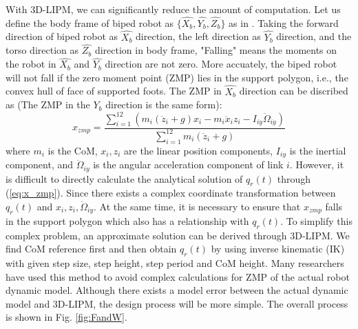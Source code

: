 \documentclass{ieeeaccess}
\begin{document}
With 3D-LIPM, we can significantly reduce the amount of computation. Let us define the body frame of biped robot as $\{ \widehat{X_b}, \widehat{Y_b}, \widehat{Z_b} \}$ as in \cite{ourrobot}. Taking the forward direction of biped robot as $\widehat{X_b}$ direction, the left direction as $\widehat{Y_b}$ direction, and the torso direction as $\widehat{Z_b}$ direction in body frame, "Falling" means the moments on the robot in $\widehat{X_b}$ and $\widehat{Y_b}$ direction are not zero. More accuately, the biped robot will not fall if the zero moment point (ZMP) lies in the support polygon, i.e., the convex hull of face of supported foots. The ZMP in $\widehat{X_b}$ direction can be discribed as \cite{huang2001planning} (The ZMP in the $\widehat{Y_b}$ direction is the same form):
\begin{equation} \label{eq:x_zmp}
    x_{zmp} = \frac{\sum_{i=1}^{12} (m_i(\ddot{z}_i+g)x_i - m_i\ddot{x}_iz_i - I_{iy}\ddot{\Omega}_{iy})}
                   {\sum_{i=1}^{12} m_i(\ddot{z}_i+g)}
\end{equation}
where $m_i$ is the CoM, $x_i, z_i$ are the linear position components, $I_{iy}$ is the inertial component, and $\ddot{\Omega}_{iy}$ is the angular acceleration component of link $i$. However, it is difficult to directly calculate the analytical solution of $q_r(t)$ through (\ref{eq:x_zmp}). Since there exists a complex coordinate transformation between $q_r(t)$ and $x_i, z_i, \ddot{\Omega}_{iy}$. At the same time, it is necessary to ensure that $x_{zmp}$ falls in the support polygon which also has a relationship with $q_r(t)$. To simplify this complex problem, an approximate solution can be derived through 3D-LIPM. We find CoM reference first and then obtain $q_r(t)$ by using inverse kinematic (IK) with given step size, step height, step period and CoM height. Many researchers have used this method to avoid complex calculations for ZMP of the actual robot dynamic model. Although there exists a model error between the actual dynamic model and 3D-LIPM, the design process will be more simple. The overall process is shown in Fig. \ref{fig:FandW}.
\end{document}
